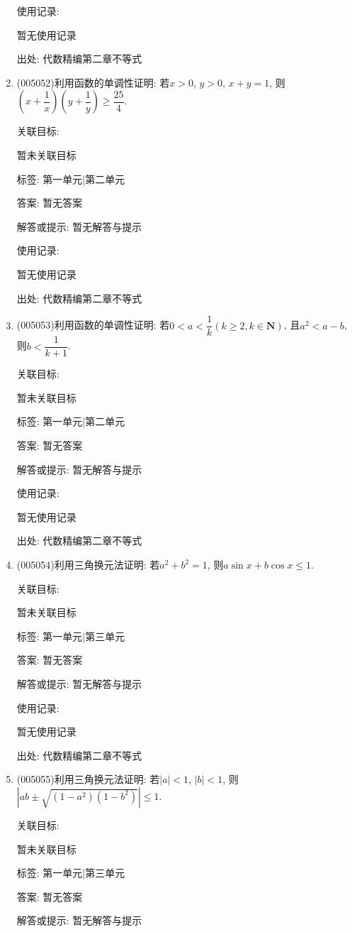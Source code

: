 \documentclass[10pt,a4paper]{article}
\begin{document}
\begin{enumerate}[1.]
使用记录:

暂无使用记录


出处: 代数精编第二章不等式
\item { (005052)}利用函数的单调性证明: 若$x>0$, $y>0$, $x+y=1$, 则$(x+\dfrac 1x)(y+\dfrac 1y)\ge \dfrac{25}4$.


关联目标:

暂未关联目标



标签: 第一单元|第二单元

答案: 暂无答案

解答或提示: 暂无解答与提示

使用记录:

暂无使用记录


出处: 代数精编第二章不等式
\item { (005053)}利用函数的单调性证明: 若$0<a<\dfrac 1k(k\ge 2,k\in \mathbf{N})$, 且$a^2<a-b$, 则$b<\dfrac 1{k+1}$.


关联目标:

暂未关联目标



标签: 第一单元|第二单元

答案: 暂无答案

解答或提示: 暂无解答与提示

使用记录:

暂无使用记录


出处: 代数精编第二章不等式
\item { (005054)}利用三角换元法证明: 若$a^2+b^2=1$, 则$a\sin x+b\cos x\le 1$.


关联目标:

暂未关联目标



标签: 第一单元|第三单元

答案: 暂无答案

解答或提示: 暂无解答与提示

使用记录:

暂无使用记录


出处: 代数精编第二章不等式
\item { (005055)}利用三角换元法证明: 若$|a|<1$, $|b|<1$, 则$|ab\pm \sqrt{(1-{a^2})(1-{b^2})}|\le 1$.


关联目标:

暂未关联目标



标签: 第一单元|第三单元

答案: 暂无答案

解答或提示: 暂无解答与提示


\end{enumerate}
\end{document}
